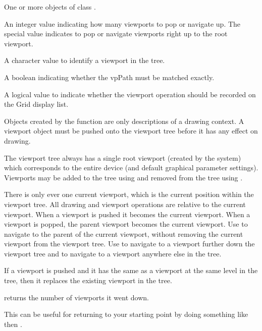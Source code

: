 \begin{Arguments}
\begin{ldescription}
\item[\code{...}] One or more objects of class .
\item[\code{n}] An integer value indicating how many viewports to
pop or navigate up.  The special value  indicates to
pop or navigate viewports right up to the root viewport.
\item[\code{name}] A character value to identify a viewport in the tree.
\item[\code{strict}]  A boolean indicating whether the vpPath must be
matched exactly. 
\item[\code{recording}] A logical value to indicate whether the viewport
operation should be recorded on the Grid display list.
\end{ldescription}
\end{Arguments}
%
\begin{Details}\relax
Objects created by the  function are only
descriptions
of a drawing context.  A viewport object must be pushed onto the
viewport tree before it has any effect on drawing.

The viewport tree always has a single root viewport (created by the
system) which corresponds to the entire device (and default
graphical parameter settings).  Viewports may be added to the tree
using  and removed from the tree using
.  

There is only ever one current viewport, which is the current
position within the viewport tree.  All drawing and
viewport operations are relative to the current viewport.
When a viewport is pushed it becomes the current viewport.
When a viewport is popped, the parent viewport becomes
the current viewport.  Use  to navigate to the parent
of the current viewport, without removing the current viewport
from the viewport tree.  Use  to navigate to
a viewport further down the viewport tree and 
to navigate to a viewport anywhere else in the tree.

If a viewport is pushed and it has the same  as a
viewport at the same level in the tree, then it replaces the
existing viewport in the tree.
\end{Details}
%
\begin{Value}
 returns the number of viewports it went down.

This can be useful for returning to your starting point by doing
something like  then
.
\end{Value}
